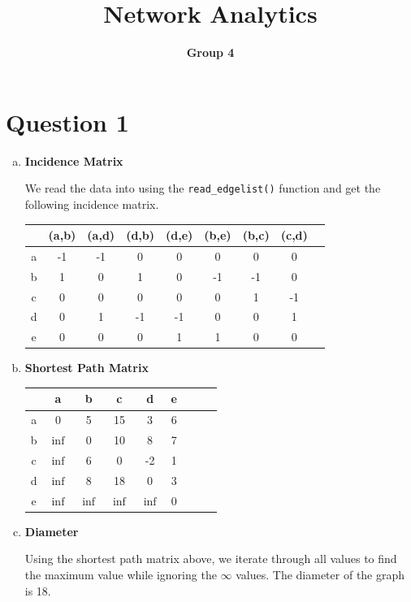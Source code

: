 \documentclass[a4paper]{article}
\begin{document}
\title{Network Analytics}
\author{\bf Group 4}
\maketitle
\section*{Question 1}

\begin{enumerate}[(a)]
\item \textbf{Incidence Matrix}

We read the data into using the \texttt{read\_edgelist()} function and get the following incidence matrix.
\begin{table}[ht]
\begin{center}
\begin{tabular}{c|cccccccc}
& (a,b) & (a,d) & (d,b) & (d,e) & (b,e) &(b,c) & (c,d)\\
\hline
a & -1 & -1 	& 0 	& 0 	& 0	& 0	&0\\
b &1 	& 0	& 1 	& 0	& -1	& -1	& 0\\
c &0 	& 0 	& 0 	& 0	&0	&1	&-1\\
d & 0 	& 1 	& -1 	& -1	& 0	&0	&1\\
e & 0 	& 0 	& 0 	& 1	& 1	&0	&0\\
\end{tabular}
\end{center}
\end{table}

\item \textbf{Shortest Path Matrix}

\begin{table}[ht]
\begin{center}
\begin{tabular}{c|cccccccc}
& a & b & c & d & e\\
\hline
a & 0 		& 5	& 15	& 3 	& 6\\
b &$\inf$ 	& 0	& 10 	& 8	& 7\\
c &$\inf$ 	& 6 	& 0 	& -2	& 1\\
d &$\inf$ 	& 8 	& 18 	& 0	& 3\\
e &$\inf$ 	&$\inf$& $\inf$& $\inf$	& 0
\end{tabular}
\end{center}
\end{table}

\item \textbf{Diameter}

Using the shortest path matrix above, we iterate through all values to find the maximum value while ignoring the $\infty$ values. The diameter of the graph is 18.


\end{enumerate}
\end{document}
